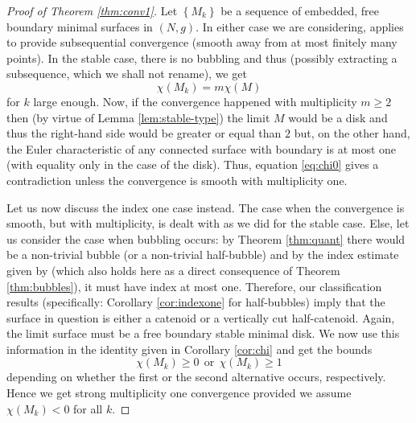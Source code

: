 \documentclass[10pt]{amsart}
\newcounter{cas}
\theoremstyle{definition}
\begin{document}
\begin{proof}[Proof of Theorem \ref{thm:conv1}] Let $\left\{M_k\right\}$ be a sequence of embedded, free boundary minimal surfaces in $(N,g)$. In either case we are considering, \cite[Th.\,2]{ACS17} applies to provide subsequential convergence (smooth away from at most finitely many points).
In the stable case, there is no bubbling and thus (possibly extracting a subsequence, which we shall not rename), we get
\begin{equation}\label{eq:chi0}
\chi(M_k)=m\chi(M)
\end{equation}
for $k$ large enough. Now, if the convergence happened with multiplicity $m\geq 2$ then (by virtue of Lemma \ref{lem:stable-type}) the limit $M$ would be a disk and thus the right-hand side would be greater or equal than $2$ but, on the other hand, the Euler characteristic of any connected surface with boundary is at most one (with equality only in the case of the disk). Thus, equation \eqref{eq:chi0} gives a contradiction unless the convergence is smooth with multiplicity one.

Let us now discuss the index one case instead. The case when the convergence is smooth, but with multiplicity, is dealt with as we did for the stable case. Else, let us consider the case when bubbling occurs: by Theorem \ref{thm:quant} there would be a non-trivial bubble (or a non-trivial half-bubble) and by the index estimate given by \cite[Lem.\,12]{ABCS18} (which also holds here as a direct consequence of Theorem \ref{thm:bubbles}), it must have index at most one. Therefore, our classification results (specifically: Corollary \ref{cor:indexone} for half-bubbles) imply that the surface in question is either a catenoid or a vertically cut half-catenoid. Again, the limit surface must be a free boundary stable minimal disk. We now use this information in the identity given in Corollary \ref{cor:chi} and get the bounds
\[
\chi(M_k)\geq 0 \ \ \text{or} \ \ \chi(M_k)\geq 1
\]
depending on whether the first or the second alternative occurs, respectively. Hence we get strong multiplicity one convergence provided we assume $\chi(M_k)<0$ for all $k$.


\end{proof}
\end{document}
